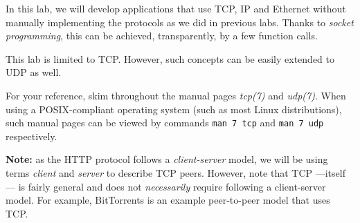 \documentclass[pdftex,12pt,a4paper]{article}
\begin{document}
            In this lab, we will develop applications that use TCP, IP and
            Ethernet without manually implementing the protocols as we did in
            previous labs. Thanks to \emph{socket programming}, this can be
            achieved, transparently, by a few function calls.

            This lab is limited to TCP. However, such concepts can be easily
            extended to UDP as well.

            For your reference, skim throughout the manual pages \emph{tcp(7)}
            and \emph{udp(7)}. When using a POSIX-compliant operating system
            (such as most Linux distributions), such manual pages can be viewed
            by commands \texttt{man 7 tcp} and \texttt{man 7 udp} respectively.

            \textbf{Note:} as the HTTP protocol follows a \emph{client-server}
            model, we will be using terms \emph{client} and \emph{server} to
            describe TCP peers. However, note that TCP ---itself--- is fairly
            general and does not \emph{necessarily} require following a
            client-server model. For example, BitTorrents is an example
            peer-to-peer model that uses TCP.
\end{document}

